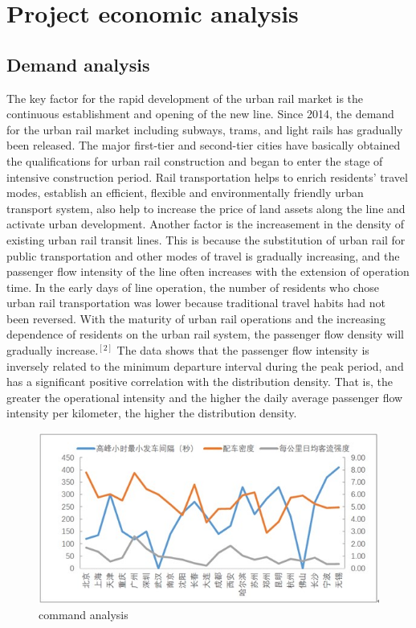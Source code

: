 \documentclass[12pt]{article}
\begin{document}
\newpage
\section{Project economic analysis}
\subsection{Demand analysis}
The key factor for the rapid development of the urban rail market is the continuous establishment and opening of the new line. Since 2014, the demand for the urban rail market including subways, trams, and light rails has gradually been released. The major first-tier and second-tier cities have basically obtained the qualifications for urban rail construction and began to enter the stage of intensive construction period. Rail transportation helps to enrich residents' travel modes, establish an efficient, flexible and environmentally friendly urban transport system, also help to increase the price of land assets along the line and activate urban development.
Another factor is the increasement in the density of existing urban rail transit lines. This is because the substitution of urban rail for public transportation and other modes of travel is gradually increasing, and the passenger flow intensity of the line often increases with the extension of operation time.
In the early days of line operation, the number of residents who chose urban rail transportation was lower because traditional travel habits had not been reversed. With the maturity of urban rail operations and the increasing dependence of residents on the urban rail system, the passenger flow density will gradually increase.$^{[2]}$
The data shows that the passenger flow intensity is inversely related to the minimum departure interval during the peak period, and has a significant positive correlation with the distribution density. That is, the greater the operational intensity and the higher the daily average passenger flow intensity per kilometer, the higher the distribution density.

\begin{figure}[htbp]
	\centering
	\includegraphics[width=6in]{figures/02.jpg}
	\caption{command analysis}
\end{figure}
\end{document}

